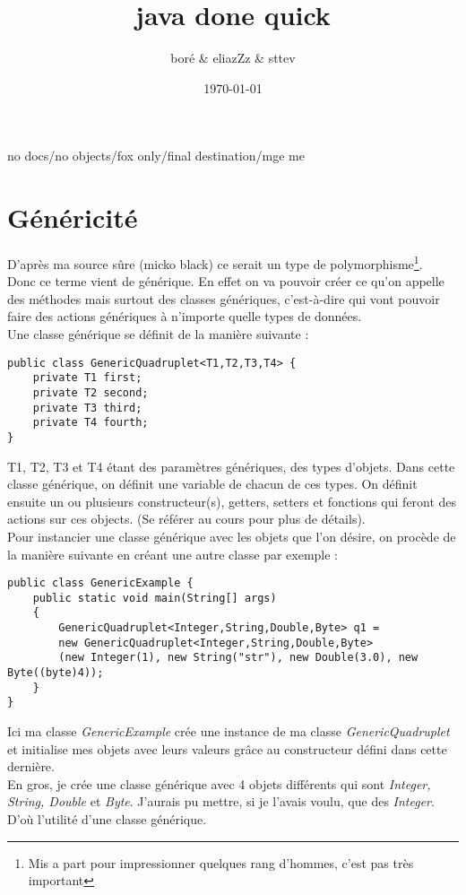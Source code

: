 \documentclass{article}
\title{java done quick}
\author{boré \& eliazZz \& sttev }
\date{\today}
\begin{document}
\maketitle{}

no docs/no objects/fox only/final destination/mge me
\section{Généricité}
D'après ma source sûre (micko black) ce serait un type de polymorphisme\footnote{Mis a part pour impressionner quelques rang d'hommes, c'est pas très important}.\\
Donc ce terme vient de générique. En effet on va pouvoir créer ce qu'on appelle des méthodes mais surtout des classes génériques, c'est-à-dire qui vont pouvoir faire des actions génériques à n'importe quelle types de données.\\
Une classe générique se définit de la manière suivante :
\begin{lstlisting}
public class GenericQuadruplet<T1,T2,T3,T4> {
	private T1 first;
	private T2 second;
	private T3 third;
	private T4 fourth;
}
\end{lstlisting}
T1, T2, T3 et T4 étant des paramètres génériques, des types d'objets. Dans cette classe générique, on définit une variable de chacun de ces types. On définit ensuite un ou plusieurs constructeur(s), getters, setters et fonctions qui feront des actions sur ces objects. (Se référer au cours pour plus de détails).\\
Pour instancier une classe générique avec les objets que l'on désire, on procède de la manière suivante en créant une autre classe par exemple :
\begin{lstlisting}
public class GenericExample {
	public static void main(String[] args)
	{
		GenericQuadruplet<Integer,String,Double,Byte> q1 =
		new GenericQuadruplet<Integer,String,Double,Byte>
		(new Integer(1), new String("str"), new Double(3.0), new Byte((byte)4));
	}
}
\end{lstlisting}
Ici ma classe \emph{GenericExample} crée une instance de ma classe \emph{GenericQuadruplet} et initialise mes objets avec leurs valeurs grâce au constructeur défini dans cette dernière.\\
En gros, je crée une classe générique avec 4 objets différents qui sont\emph{ Integer, String, Double} et \emph{Byte}. J'aurais pu mettre, si je l'avais voulu, que des \emph{Integer}. D'où l'utilité d'une classe générique.\\
\end{document}
